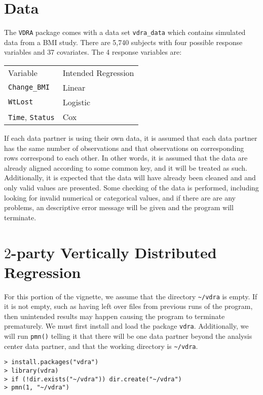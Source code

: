 \documentclass[12]{article}
\begin{document}
\section{Data}

The \verb"VDRA" package comes with a data set \verb"vdra_data" which contains simulated data from a BMI study.  There are 5,740 subjects with four possible response variables and 37 covariates.  The 4 response variables are:

\begin{center}
\begin{tabular}{ll}
	Variable & Intended Regression \\
	\verb"Change_BMI" & Linear\\
	\verb"WtLost" & Logistic \\
	\verb"Time", \verb"Status" & Cox
\end{tabular}
\end{center}


If each data partner is using their own data, it is assumed that each data partner has the same number of observations and that observations on corresponding rows correspond to each other.  In other words, it is assumed that the data are already aligned according to some common key, and it will be treated as such.  Additionally, it is expected that the data will have already been cleaned and and only valid values are presented.  Some checking of the data is performed, including looking for invalid numerical or categorical values, and if there are are any problems, an descriptive error message will be given and the program will terminate.  

\section{$2$-party Vertically Distributed Regression}

For this portion of the vignette, we assume that the directory \verb"~/vdra" is empty.  If it is not empty, such as having left over files from previous runs of the program, then unintended results may happen causing the program to terminate prematurely.  We must first install and load the package \verb"vdra".  Additionally, we will run \verb"pmn()" telling it that there will be one data partner beyond the analysis center data partner, and that the working directory is \verb"~/vdra".

\begin{verbatim}
> install.packages("vdra")
> library(vdra)
> if (!dir.exists("~/vdra")) dir.create("~/vdra")
> pmn(1, "~/vdra")
\end{verbatim}
\end{document}

